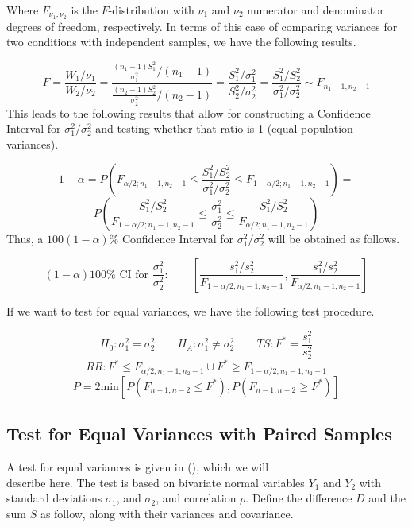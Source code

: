 \documentclass[
]{book}
\begin{document}
Where \(F_{\nu_1,\nu_2}\) is the \(F\)-distribution with \(\nu_1\) and
\(\nu_2\) numerator and denominator degrees of freedom, respectively. In
terms of this case of comparing variances for two conditions with
independent samples, we have the following results.

\[
F=\frac{W_1/{\nu_1}}{W_2/{\nu_2}}=\frac{\frac{\left(n_1-1\right)S_1^2}{\sigma_1^2}/
\left(n_1-1\right)}{\frac{\left(n_2-1\right)S_2^2}{\sigma_2^2}/
\left(n_2-1\right)}=\frac{S_1^2/\sigma_1^2}{S_2^2/\sigma_2^2}=
\frac{S_1^2/S_2^2}{\sigma_1^2/\sigma_2^2} \sim F_{n_1-1,n_2-1}
\] This leads to the following results that allow for constructing a
Confidence Interval for \(\sigma_1^2/\sigma_2^2\) and testing whether
that ratio is 1 (equal population variances).

\[
1-\alpha = P\left(F_{\alpha/2;n_1-1,n_2-1} \leq 
\frac{S_1^2/S_2^2}{\sigma_1^2/\sigma_2^2} \leq 
F_{1-\alpha/2;n_1-1,n_2-1}
\right) = 
\] \[
P\left(
\frac{S_1^2/S_2^2}{F_{1-\alpha/2;n_1-1,n_2-1}}\leq \frac{\sigma_1^2}{\sigma_2^2} \leq
\frac{S_1^2/S_2^2}{F_{\alpha/2;n_1-1,n_2-1}}
\right)
\] Thus, a \(100(1-\alpha)\%\) Confidence Interval for
\(\sigma_1^2/\sigma_2^2\) will be obtained as follows.

\[
(1-\alpha)100\% \mbox{ CI for } \frac{\sigma_1^2}{\sigma_2^2}: \qquad
\left[\frac{s_1^2/s_2^2}{F_{1-\alpha/2;n_1-1,n_2-1}},
\frac{s_1^2/s_2^2}{F_{\alpha/2;n_1-1,n_2-1}}\right]
\]

If we want to test for equal variances, we have the following test
procedure.

\[
H_0:\sigma_1^2=\sigma_2^2 \qquad H_A:\sigma_1^2\neq\sigma_2^2 \qquad 
TS: F^*=\frac{s_1^2}{s_2^2}
\] \[
RR: F^*\leq F_{\alpha/2;n_1-1,n_2-1} \cup 
F^*\geq F_{1-\alpha/2;n_1-1,n_2-1} 
\] \[
P=2\mbox{min}\left[P\left(F_{n-1,n-2}\leq F^*\right),P\left(F_{n-1,n-2}\geq F^*\right)\right]
\]

\subsection{Test for Equal Variances with Paired
Samples}\label{test-for-equal-variances-with-paired-samples}

A test for equal variances is given in
(), which we
will\\
describe here. The test is based on bivariate normal variables \(Y_1\)
and \(Y_2\) with standard deviations \(\sigma_1\), and \(\sigma_2\), and
correlation \(\rho\). Define the difference \(D\) and the sum \(S\) as
follow, along with their variances and covariance.
\end{document}
